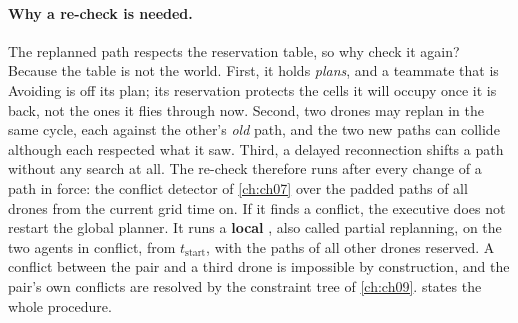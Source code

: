 \paragraph{Why a re-check is needed.}
The replanned path respects the reservation table, so why check it again?
Because the table is not the world. First, it holds \emph{plans}, and a
teammate that is Avoiding is off its plan; its reservation protects the
cells it will occupy once it is back, not the ones it flies through now.
Second, two drones may replan in the same cycle, each against the other's
\emph{old} path, and the two new paths can collide although each respected
what it saw. Third, a delayed reconnection shifts a path without any search
at all. The re-check therefore runs after every change of a path in force:
the conflict detector of \cref{ch:ch07} over the padded paths of all drones
from the current grid time on. If it finds a conflict, the executive does
not restart the global planner. It runs a \textbf{local
\cbs}, also
called partial replanning, on the two agents in conflict, from
$t_{\mathrm{start}}$, with the paths of all other drones reserved. A
conflict between the pair and a third drone is impossible by construction,
and the pair's own conflicts are resolved by the constraint tree of
\cref{ch:ch09}.  states the whole procedure.

